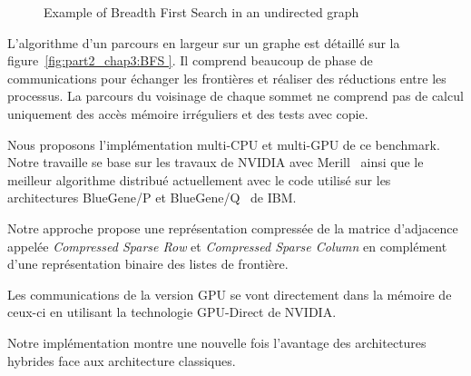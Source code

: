 \documentclass[12pt,a4paper]{report}
\begin{document}
\begin{figure}
\centering

\caption{Example of Breadth First Search in an undirected graph}
\label{fig:part2_chap3:BFS}
\end{figure}

L'algorithme d'un parcours en largeur sur un graphe est détaillé sur la figure~\ref{fig:part2_chap3:BFS }.
Il comprend beaucoup de phase de communications pour échanger les frontières et réaliser des réductions entre les processus. 
La parcours du voisinage de chaque sommet ne comprend pas de calcul uniquement des accès mémoire irréguliers et des tests avec copie. 

Nous proposons l'implémentation multi-CPU et multi-GPU de ce benchmark. 
Notre travaille se base sur les travaux de NVIDIA avec Merill~\cite{merrill2015high} ainsi que le meilleur algorithme distribué actuellement avec le code utilisé sur les architectures BlueGene/P et BlueGene/Q~\cite{6468459} de IBM. 

Notre approche propose une représentation compressée de la matrice d'adjacence appelée \textit{Compressed Sparse Row} et \textit{Compressed Sparse Column} en complément d'une représentation binaire des listes de frontière. 

Les communications de la version GPU se vont directement dans la mémoire de ceux-ci en utilisant la technologie GPU-Direct de NVIDIA. 

Notre implémentation montre une nouvelle fois l'avantage des architectures hybrides face aux architecture classiques.
\end{document}
